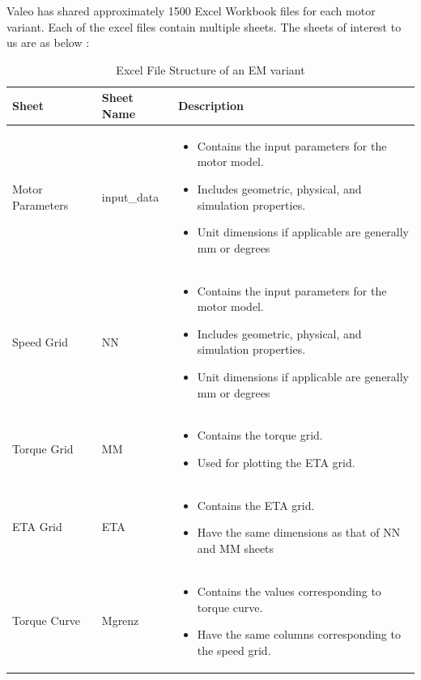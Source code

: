\documentclass{report} %
\begin{document}
\newpage 

Valeo has shared approximately 1500 Excel Workbook files for each motor variant. Each of the excel files contain multiple sheets.
The sheets of interest to us are as below :
\begin{table}[H]
    \centering
    \begin{tabular}{|p{2cm}|p{2cm}|p{11cm}|}
    \hline {\bf Sheet} & {\bf Sheet Name} & {\bf Description}\\
    \hline Motor Parameters & input\_data & 
    \begin{itemize}
        \item Contains the input parameters for the motor model.
        \item Includes geometric, physical, and simulation properties.
        \item Unit dimensions if applicable are generally mm or degrees 
    \end{itemize}\\
    Speed Grid & NN & 
    \begin{itemize}
        \item Contains the input parameters for the motor model.
        \item Includes geometric, physical, and simulation properties.
        \item Unit dimensions if applicable are generally mm or degrees 
    \end{itemize}\\
    Torque Grid & MM & 
    \begin{itemize}
        \item Contains the torque grid.
        \item Used for plotting the ETA grid.
    \end{itemize}\\
    ETA Grid & ETA & 
    \begin{itemize}
        \item Contains the ETA grid.
        \item Have the same dimensions as that of NN and MM sheets
    \end{itemize}\\
    Torque Curve & Mgrenz & 
    \begin{itemize}
        \item Contains the values corresponding to torque curve.
        \item Have the same columns corresponding to the speed grid.
    \end{itemize}\\
    \hline
    \end{tabular}
    \caption{Excel File Structure of an \ac{EM} variant}
    \label{tab:Excel File Structure}
\end{table}
\end{document}
